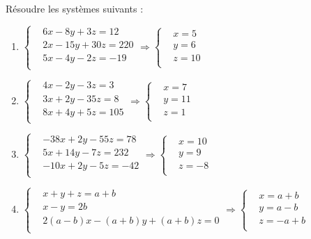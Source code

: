 \begin{solution}
Résoudre les systèmes suivants :
\begin{multicols}{2}
\begin{enumerate}
\item $\left\{ \begin{array}{ll}
  & 6x-8y+3z=12 \\ 
 & 2x-15y+30z=220 \\ 
 & 5x-4y-2z=-19 \\ 
\end{array} \right.\Rightarrow \left\{ \begin{array}{ll}
  & x=5 \\ 
 & y=6 \\ 
 & z=10 \\ 
\end{array} \right.$
\item $\left\{ \begin{array}{ll}
  & 4x-2y-3z=3 \\ 
 & 3x+2y-35z=8 \\ 
 & 8x+4y+5z=105 \\ 
\end{array} \right.\Rightarrow \left\{ \begin{array}{ll}
  & x=7 \\ 
 & y=11 \\ 
 & z=1 \\ 
\end{array} \right.$
\item $\left\{ \begin{array}{ll}
  & -38x+2y-55z=78 \\ 
 & 5x+14y-7z=232 \\ 
 & -10x+2y-5z=-42 \\ 
\end{array} \right.\Rightarrow \left\{ \begin{array}{ll}
  & x=10 \\ 
 & y=9 \\ 
 & z=-8 \\ 
\end{array} \right.$
\item $\left\{ \begin{array}{ll}
  & x+y+z=a+b \\ 
 & x-y=2b \\ 
 & 2\left( a-b \right)x-\left( a+b \right)y+\left( a+b \right)z=0 \\ 
\end{array} \right.\Rightarrow \left\{ \begin{array}{ll}
  & x=a+b \\ 
 & y=a-b \\ 
 & z=-a+b \\ 
\end{array} \right.$
\end{enumerate}
\end{multicols}
\end{solution}

